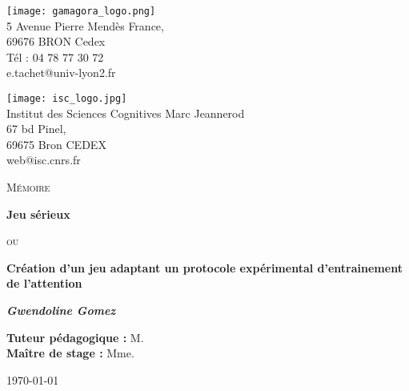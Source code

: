 \begin{titlepage}
	
	\centering

	\begin{minipage}[b]{0.45\linewidth}
		\centering
		\texttt{[image: gamagora\_logo.png]} \\
		5 Avenue Pierre Mendès France, \\
		69676 BRON Cedex \\
		Tél : 04 78 77 30 72 \\
		e.tachet@univ-lyon2.fr
	\end{minipage}
	\hfill
	\begin{minipage}[b]{0.45\linewidth}
		\centering
		\texttt{[image: isc\_logo.jpg]} \\
		Institut des Sciences Cognitives Marc Jeannerod \\
		67 bd Pinel, \\
		69675 Bron CEDEX \\
		web@isc.cnrs.fr 
	\end{minipage}
	
	\vspace{2cm}
	
	{\scshape\LARGE Mémoire \par}
	\vspace{1cm}
	{\huge\bfseries Jeu sérieux\par}
	\vspace{0.5cm}
	{\scshape\LARGE ou\par}
	\vspace{0.5cm}
	{\huge\bfseries Création d'un jeu adaptant un protocole expérimental d'entrainement de l'attention\par}
	\vspace{1.5cm}
    {\Large\itshape\textbf{Gwendoline Gomez}\par}
    \vspace{1.5cm}
    {\textbf{Tuteur pédagogique : }M.~\\}
    {\textbf{Maître de stage : }Mme.~}
	\vfill
	
	\centering 
    \begin{minipage}[b]{0.6\linewidth}
        
    \end{minipage}
    \hfill	
	 \begin{minipage}[b]{0.3\linewidth}
		{\large \today\par}
	 \end{minipage}
\end{titlepage}	

\newpage